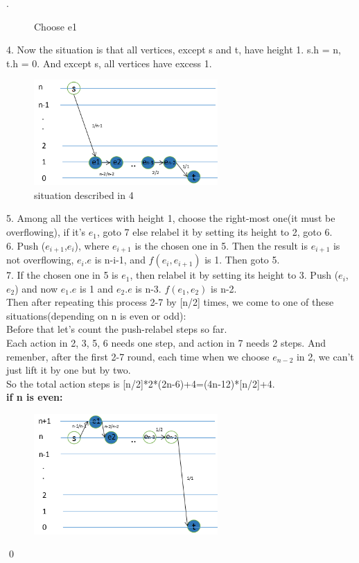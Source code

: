 \documentclass[12pt, notitlepage]{article}
\newenvironment{sol}
  {\par\vspace{3mm}\noindent{\it Solution}.}{\qed}
\begin{document}
\begin{sol}
\begin{enumerate}
\begin{figure}[H]
	\caption{Choose e1}
	\end{figure}
4. Now the situation is that all vertices, except s and t,  have height 1. s.h = n, t.h = 0. And except s, all vertices have excess 1.\\
	\begin{figure}[H]\centering
	\includegraphics[width=7cm]{3.png}
	\caption{situation described in 4}
	\end{figure}
5. Among all the vertices with height 1, choose the right-most one(it must be overflowing), if it's $e_1$, goto 7 else relabel it  by setting its height to 2, goto 6.\\
6. Push ($e_{i+1}$,$e_i$), where $e_{i+1}$ is the chosen one in 5. Then the result is $e_{i+1}$ is not overflowing, $e_i.e$ is n-i-1, and $f(e_i,e_{i+1})$ is 1. Then goto 5.\\
7. If the chosen one in 5 is $e_1$, then relabel it by setting its height to 3. Push ($e_i$,$e_2$) and now $e_1.e$ is 1 and $e_2.e$ is n-3. $f(e_1,e_2)$ is n-2.\\
Then after repeating this process 2-7 by [n/2] times, we come to one of these situations(depending on n is even or odd):\\
Before that let's count the push-relabel steps so far. \\
Each action in 2, 3, 5, 6 needs one step, and action in 7 needs 2 steps. And remenber, after the first 2-7 round, each time when we choose $e_{n-2}$ in 2, we can't just lift it by one but by two.\\
So the total action steps is [n/2]*2*(2n-6)+4=(4n-12)*[n/2]+4.\\
\textbf{if n is even:}\\
	\begin{figure}[H]\centering
	\includegraphics[width=7cm]{4.png}

\end{figure}
\end{enumerate}
\end{sol}
\end{document}
